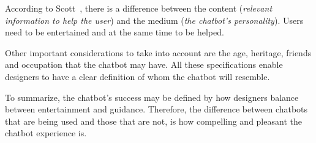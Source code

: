 \documentclass[a4paper,10pt]{article}
\begin{document}
According to Scott~\cite{HeuristicsWebPage}, there is a difference between the content (\textit{relevant information to help the user}) and the medium (\textit{the chatbot’s personality}). Users need to be entertained and at the same time to be helped.      


Other important considerations to take into account are the age, heritage, friends and occupation that the chatbot may have. All these specifications enable designers to have a clear definition of whom the chatbot will resemble.

To summarize, the chatbot’s success may be defined by how designers balance between entertainment and guidance. Therefore, the difference between chatbots that are being used and those that are not, is how compelling and pleasant the chatbot experience is.


\end{document}
